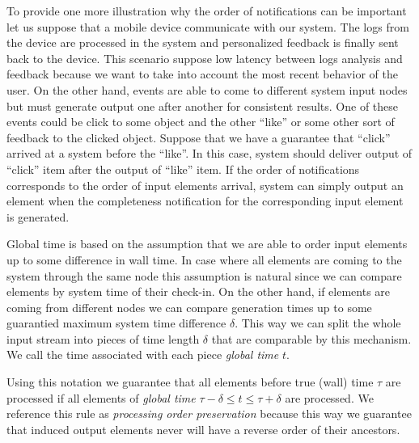 To provide one more illustration why the order of notifications can be important let us suppose that a mobile device communicate with our system. The logs from the device are processed in the system and personalized feedback is finally sent back to the device. This scenario suppose low latency between logs analysis and feedback because we want to take into account the most recent behavior of the user. On the other hand, events are able to come to different system input nodes but must generate output one after another for consistent results. One of these events could be click to some object and the other ``like'' or some other sort of feedback to the clicked object. Suppose that we have a guarantee that ``click'' arrived at a system before the ``like''. In this case, system should deliver output of ``click'' item after the output of ``like'' item. If the order of notifications corresponds to the order of input elements arrival, system can simply output an element when the completeness notification for the corresponding input element is generated.

Global time is based on the assumption that we are able to order input elements up to some difference in wall time. In case where all elements are coming to the system through the same node this assumption is natural since we can compare elements by system time of their check-in. On the other hand, if elements are coming from different nodes we can compare generation times up to some guarantied maximum system time difference $\delta$. This way we can split the whole input stream into pieces of time length $\delta$ that are comparable by this mechanism. We call the time associated with each piece \textit{global time} $t$.

Using this notation we guarantee that all elements before true (wall) time $\tau$ are processed if all elements of \textit{global time} $\tau - \delta \le t \le \tau + \delta$ are processed. We reference this rule as \textit{processing order preservation} because this way we guarantee that induced output elements never will have a reverse order of their ancestors.

